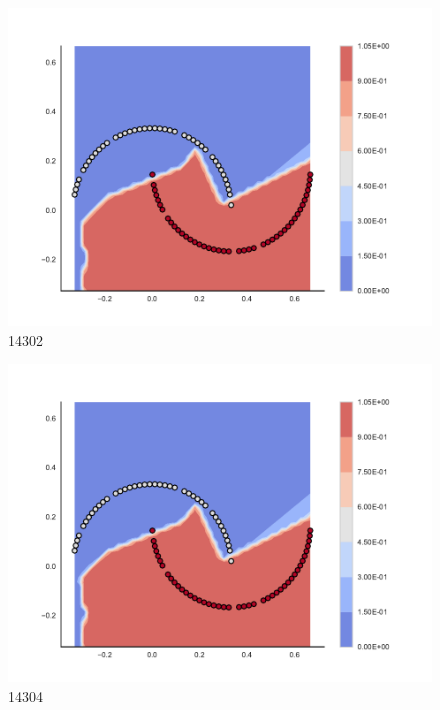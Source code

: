 \begin{subfigure}[b]{0.09\textwidth}
    \includegraphics[clip, trim=2.35cm 1.75cm 4.5cm 0cm,width=\textwidth]{img/convergence/14302.pdf}
    \caption{14302}
    \label{fig:convergence_14302}
\end{subfigure}
%
\begin{subfigure}[b]{0.09\textwidth}
    \includegraphics[clip, trim=2.35cm 1.75cm 4.5cm 0cm,width=\textwidth]{img/convergence/14304.pdf}
    \caption{14304}
    \label{fig:convergence_14304}
\end{subfigure}
%
